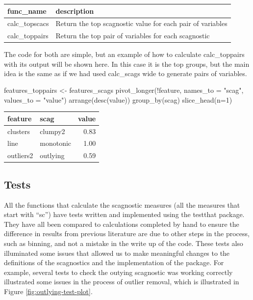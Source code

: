 \begin{Schunk}

\begin{tabular}{l|l}
\hline
func\_name & description\\
\hline
calc\_topscacs & Return the top scagnostic value for each pair of variables\\
\hline
calc\_toppairs & Return the top pair of variables for each scagnostic\\
\hline
\end{tabular}

\end{Schunk}

The code for both are simple, but an example of how to calculate
calc\_toppairs with its output will be shown here. In this case it is
the top groups, but the main idea is the same as if we had used
calc\_scags wide to generate pairs of variables.

\begin{Schunk}
\begin{Sinput}
features_toppairs <- features_scags %
  pivot_longer(!feature, names_to = "scag", values_to = "value") %
  arrange(desc(value)) %
  group_by(scag) %
  slice_head(n=1)
\end{Sinput}
\end{Schunk}

\begin{Schunk}

\begin{tabular}{l|l|r}
\hline
feature & scag & value\\
\hline
clusters & clumpy2 & 0.83\\
\hline
line & monotonic & 1.00\\
\hline
outliers2 & outlying & 0.59\\
\hline
\end{tabular}

\end{Schunk}

\hypertarget{tests}{%
\subsection{Tests}\label{tests}}

All the functions that calculate the scagnostic measures (all the
measures that start with ``sc'') have tests written and implemented
using the testthat package. They have all been compared to calculations
completed by hand to ensure the difference in results from previous
literature are due to other steps in the process, such as binning, and
not a mistake in the write up of the code. These tests also illuminated
some issues that allowed us to make meaningful changes to the
definitions of the scagnostics and the implementation of the package.
For example, several tests to check the outying scagnostic was working
correctly illustrated some issues in the process of outlier removal,
which is illustrated in Figure \ref{fig:outlying-test-plot}.

